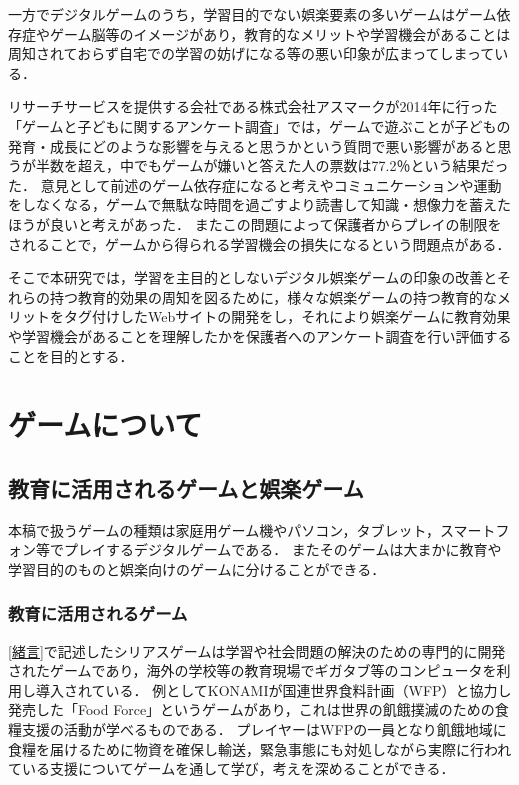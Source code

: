 \documentclass[12pt,a4j,titlepage]{ltjsarticle}
\begin{document}
一方でデジタルゲームのうち，学習目的でない娯楽要素の多いゲームはゲーム依存症やゲーム脳等のイメージがあり，教育的なメリットや学習機会があることは周知されておらず自宅での学習の妨げになる等の悪い印象が広まってしまっている．

リサーチサービスを提供する会社である株式会社アスマークが2014年に行った「ゲームと子どもに関するアンケート調査」\cite{gameanq}では，ゲームで遊ぶことが子どもの発育・成長にどのような影響を与えると思うかという質問で悪い影響があると思うが半数を超え，中でもゲームが嫌いと答えた人の票数は77.2％という結果だった．
意見として前述のゲーム依存症になると考えやコミュニケーションや運動をしなくなる，ゲームで無駄な時間を過ごすより読書して知識・想像力を蓄えたほうが良いと考えがあった．
またこの問題によって保護者からプレイの制限をされることで，ゲームから得られる学習機会の損失になるという問題点がある．

そこで本研究では，学習を主目的としないデジタル娯楽ゲームの印象の改善とそれらの持つ教育的効果の周知を図るために，様々な娯楽ゲームの持つ教育的なメリットをタグ付けしたWebサイトの開発をし，それにより娯楽ゲームに教育効果や学習機会があることを理解したかを保護者へのアンケート調査を行い評価することを目的とする．

\clearpage
\section{ゲームについて}
\subsection{教育に活用されるゲームと娯楽ゲーム}
本稿で扱うゲームの種類は家庭用ゲーム機やパソコン，タブレット，スマートフォン等でプレイするデジタルゲームである．
またそのゲームは大まかに教育や学習目的のものと娯楽向けのゲームに分けることができる．

\subsubsection{教育に活用されるゲーム}\label{教育ゲーム}
\ref{緒言}で記述したシリアスゲームは学習や社会問題の解決のための専門的に開発されたゲームであり，海外の学校等の教育現場でギガタブ等のコンピュータを利用し導入されている．
例としてKONAMIが国連世界食料計画（WFP）と協力し発売した「Food Force」というゲームがあり，これは世界の飢餓撲滅のための食糧支援の活動が学べるものである．
プレイヤーはWFPの一員となり飢餓地域に食糧を届けるために物資を確保し輸送，緊急事態にも対処しながら実際に行われている支援についてゲームを通して学び，考えを深めることができる．
\end{document}
